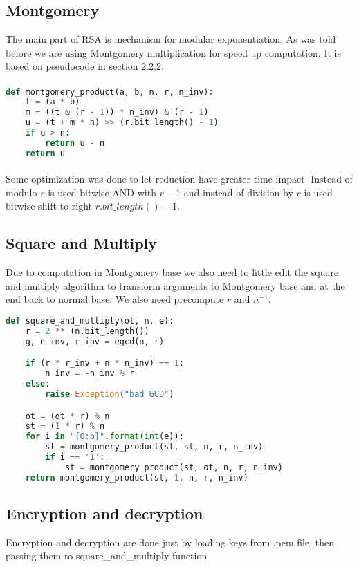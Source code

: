 \documentclass[thesis=B,english]{FITthesis}[2012/10/20]
\begin{document}
{\subsection{Montgomery}{
The main part of RSA is mechanism for modular exponentiation. As was told before we are using Montgomery multiplication for speed up computation. It is based on pseudocode in section 2.2.2.
}
\paragraph*{}
\begin{lstlisting}[language=Python]
def montgomery_product(a, b, n, r, n_inv):
    t = (a * b)
    m = ((t & (r - 1)) * n_inv) & (r - 1)
    u = (t + m * n) >> (r.bit_length() - 1)
    if u > n:
        return u - n
    return u
\end{lstlisting}

\paragraph*{}{
Some optimization was done to let reduction have greater time impact. Instead of modulo \(r\) is used bitwise AND with \(r-1\) and instead of division by \(r\) is used bitwise
shift to right \(r.bit\_length() - 1\).
}

\subsection{Square and Multiply}{
Due to computation in Montgomery base we also need to little edit the square and multiply algorithm to transform arguments to Montgomery base and at the end back to normal base.
We also need precompute \(r\) and \(n^{-1}\).
}

\begin{lstlisting}[language=Python]
 def square_and_multiply(ot, n, e):
    r = 2 ** (n.bit_length())
    g, n_inv, r_inv = egcd(n, r)

    if (r * r_inv + n * n_inv) == 1:
        n_inv = -n_inv % r
    else:
        raise Exception("bad GCD")

    ot = (ot * r) % n
    st = (1 * r) % n
    for i in "{0:b}".format(int(e)):
        st = montgomery_product(st, st, n, r, n_inv)
        if i == '1':
            st = montgomery_product(st, ot, n, r, n_inv)
    return montgomery_product(st, 1, n, r, n_inv)
\end{lstlisting}

\subsection{Encryption and decryption}{
Encryption and decryption are done just by loading keys from .pem file, then passing them to square\_and\_multiply function
}

}
\end{document}

